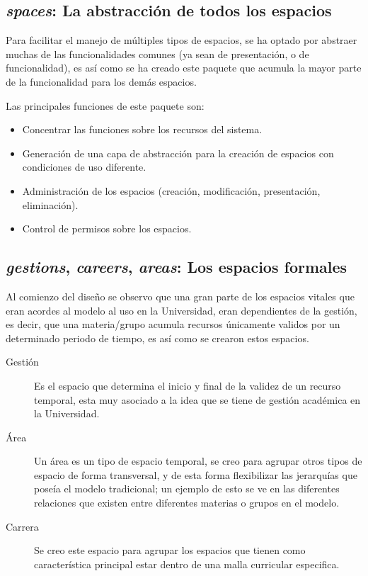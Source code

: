 \subsection{\emph{spaces}: La abstracción de todos los espacios}
Para facilitar el manejo de múltiples tipos de espacios, se ha optado por
abstraer muchas de las funcionalidades comunes (ya sean de presentación, o de
funcionalidad), es así como se ha creado este paquete que acumula la mayor parte
de la funcionalidad para los demás espacios.

Las principales funciones de este paquete son:

\begin{itemize}
\item Concentrar las funciones sobre los recursos del sistema.
\item Generación de una capa de abstracción para la creación de espacios con
condiciones de uso diferente.
\item Administración de los espacios (creación, modificación, presentación,
eliminación).
\item Control de permisos sobre los espacios.
\end{itemize}

\subsection{\emph{gestions}, \emph{careers}, \emph{areas}: Los espacios
formales}
Al comienzo del diseño se observo que una gran parte de los espacios vitales que
eran acordes al modelo al uso en la Universidad, eran dependientes de la
gestión, es decir, que una materia/grupo acumula recursos únicamente validos por
un determinado periodo de tiempo, es así como se crearon estos espacios.

\begin{description}
\item [Gestión] Es el espacio que determina el inicio y final de la validez de
un recurso temporal, esta muy asociado a la idea que se tiene de gestión
académica en la Universidad.
\item [Área] Un área es un tipo de espacio temporal, se creo para agrupar otros
tipos de espacio de forma transversal, y de esta forma flexibilizar las
jerarquías que poseía el modelo tradicional; un ejemplo de esto se ve en las
diferentes relaciones que existen entre diferentes materias o grupos en el
modelo.
\item [Carrera] Se creo este espacio para agrupar los espacios que tienen como
característica principal estar dentro de una malla curricular especifica.
\end{description}

